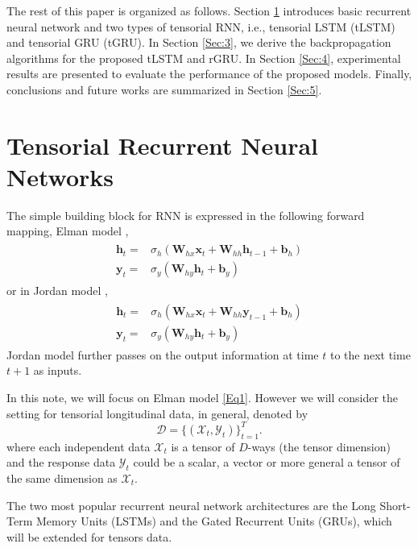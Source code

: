 \documentclass[journal]{IEEEtran}
\begin{document}
The rest of this paper is organized as follows. Section \ref{Sec:2} introduces basic recurrent neural network and two types of tensorial RNN, i.e., tensorial LSTM (tLSTM) and tensorial GRU (tGRU).   In Section \ref{Sec:3}, we derive the backpropagation algorithms for the proposed tLSTM and rGRU.    In Section \ref{Sec:4}, experimental results are presented to evaluate the performance of the proposed models. Finally, conclusions and future works are summarized in Section \ref{Sec:5}.


\section{Tensorial Recurrent Neural Networks} \label{Sec:2} 
The simple building block for RNN is expressed  in the following
forward mapping, Elman model \cite{Elman1990},
\begin{align}
\begin{aligned}
\mathbf h_t =& \sigma_h (\mathbf W_{hx}\mathbf x_t + \mathbf W_{hh}\mathbf h_{t-1} + \mathbf b_h)
\\
\mathbf y_t =&\sigma_y(\mathbf W_{hy}\mathbf h_t + \mathbf b_y)
\end{aligned} \label{Eq1}
\end{align}
or in Jordan model \cite{Jordan1997},
\begin{align}
\begin{aligned}
\mathbf h_t =& \sigma_h (\mathbf W_{hx}\mathbf x_t + \mathbf W_{hh}\mathbf y_{t-1} + \mathbf b_h)
\\
\mathbf y_t =& \sigma_y(\mathbf W_{hy}\mathbf h_t + \mathbf b_y)
\end{aligned} \label{Eq2}
\end{align}
Jordan model further passes on the output information at time $t$ to the next time $t+1$ as inputs.

In this note, we will focus on Elman model \eqref{Eq1}. However we will consider the setting for tensorial longitudinal data, in general, denoted by
\[
\mathcal{D} = \{(\mathcal{X}_t, \mathcal{Y}_t)\}^T_{t=1}.
\]
where each independent data $\mathcal{X}_t$ is a tensor of $D$-ways (the tensor dimension) and the response data $\mathcal{Y}_t$ could be a scalar, a vector or more general a tensor of the same dimension as $\mathcal{X}_t$.



The two most popular recurrent neural network architectures are the Long Short-Term Memory Units (LSTMs) and the Gated Recurrent Units (GRUs), which will be extended for tensors data.
\end{document}
